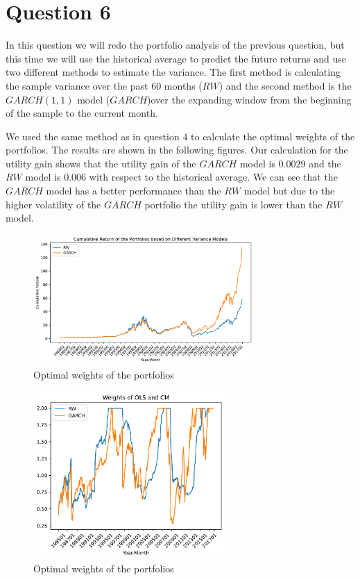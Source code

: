 \section*{Question 6}
In this question we will redo the portfolio analysis of the previous question, but this time we will use the historical average to predict the future returns and use two different methods to estimate the variance. The first method is calculating the sample variance over the past 60 months ($RW$) and the second method is the $GARCH(1,1)$ model ($GARCH$)over the expanding window from the beginning of the sample to the current month. 

     We used the same method as in question 4 to calculate the optimal weights of the portfolios. The results are shown in the following figures. 
     Our calculation for the utility gain shows that the utility gain of the $GARCH$ model is $0.0029$ and the $RW$ model is $0.006$ with respect to the historical average. 
     We can see that the $GARCH$ model has a better performance than the $RW$ model but due to the higher volatility of the $GARCH$ portfolio the utility gain is lower than the $RW$ model.




    \begin{figure}[htbp!]
        \centering
        \includegraphics[width=0.75\textwidth]{Out/Ex6_C.pdf}
        \caption{Optimal weights of the portfolios}
    \end{figure}
    

    \begin{figure}[htbp!]
        \centering
        \includegraphics[width=0.65\textwidth]{Out/Ex6_D.pdf}
        \caption{Optimal weights of the portfolios}
    \end{figure}

